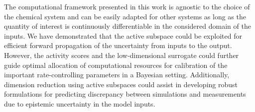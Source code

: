 The computational framework presented in this work is agnostic to the choice of
the chemical system and can be easily adapted for other systems as long
as the quantity of interest is continuously differentiable in the considered
domain of the inputs.  We have demonstrated that the active subspace could be
exploited for efficient forward propagation of the uncertainty from inputs to
the output. However, the activity scores and the low-dimensional surrogate
could further guide optimal allocation of computational resources for
calibration of the important rate-controlling parameters in a Bayesian setting.
Additionally, dimension reduction using active subspaces could assist in
developing robust formulations for predicting discrepancy between simulations
and measurements due to epistemic uncertainty in the model inputs.
